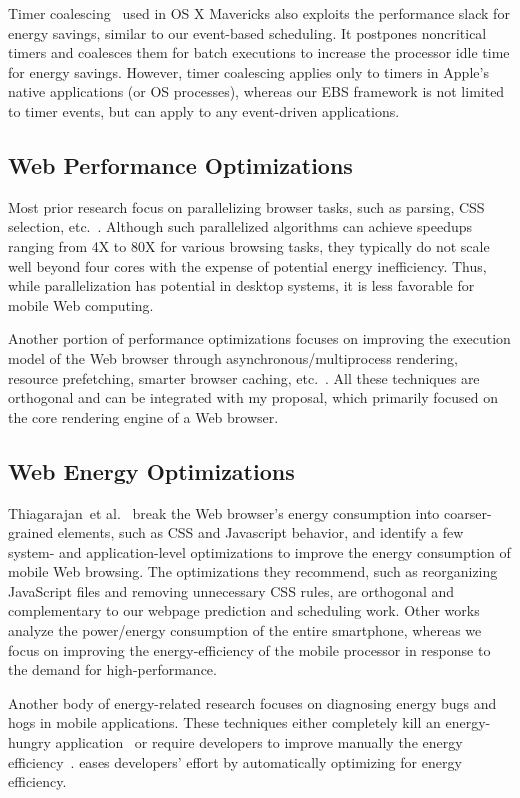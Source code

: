 Timer coalescing~\cite{powerinosx} used in OS X Mavericks also exploits the performance slack for energy savings, similar to our event-based scheduling. It postpones noncritical timers and coalesces them for batch executions to increase the processor idle time for energy savings. However, timer coalescing applies only to timers in Apple's native applications (or OS processes), whereas our EBS framework is not limited to timer events, but can apply to any event-driven applications.

\subsection{Web Performance Optimizations}
\label{sec:runtime:related:perf}

Most prior research focus on parallelizing browser tasks, such as parsing, CSS selection, etc.~\cite{ParallelBrowser,FTL,UCI,Parabix}. Although such parallelized algorithms can achieve speedups ranging from 4X to 80X for various browsing tasks, they typically do not scale well beyond four cores with the expense of potential energy inefficiency. Thus, while parallelization has potential in desktop systems, it is less favorable for mobile Web computing.

Another portion of performance optimizations focuses on improving the execution model of the Web browser through asynchronous/multiprocess rendering, resource prefetching, smarter browser caching, etc.~\cite{pocketweb,Adrenaline,smart-caching,webkit2,firefox-spec_parsing}. All these techniques are orthogonal and can be integrated with my proposal, which primarily focused on the core rendering engine of a Web browser.

\subsection{Web Energy Optimizations}
\label{sec:runtime:related:energy}

Thiagarajan~et al.~\cite{www-battery} break the Web browser's energy consumption into coarser-grained elements, such as CSS and Javascript behavior, and identify a few system- and application-level optimizations to improve the energy consumption of mobile Web browsing.  The optimizations they recommend, such as reorganizing JavaScript files and removing unnecessary CSS rules, are orthogonal and complementary to our webpage prediction and scheduling work. Other works analyze the power/energy consumption of the entire smartphone\cite{Carroll,eprof,JamesHotchip}, whereas we focus on improving the energy-efficiency of the mobile processor in response to the demand for high-performance.

Another body of energy-related research focuses on diagnosing energy bugs and hogs in mobile applications. These techniques either completely kill an energy-hungry application~\cite{carat} or require developers to improve manually the energy efficiency~\cite{energygreedapis,eprof,eLens}. \webrt eases developers' effort by automatically optimizing for energy efficiency.

